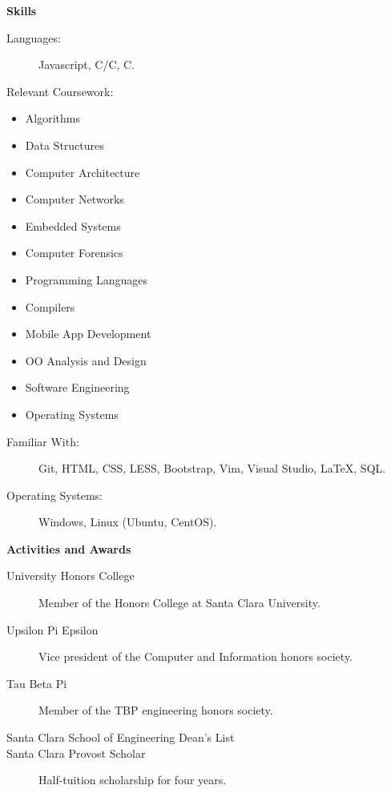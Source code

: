 \documentclass[letterpaper,11pt]{article}
\newcommand{\resheading}[1]{{\large \colorbox{mygrey}{\begin{minipage}{\textwidth}{\textbf{#1 \vphantom{p\^{E}}}}\end{minipage}}}}
\newcommand{\CC}{C\nolinebreak\hspace{-.05em}\raisebox{.4ex}{\tiny\bf +}\nolinebreak\hspace{-.10em}\raisebox{.4ex}{\tiny\bf +}}
\newcommand{\CS}{C\nolinebreak\hspace{-.05em}\raisebox{.4ex}{\scriptsize\bf \#}}
\begin{document}
\resheading{Skills}

\begin{description}
\item[Languages:]
Javascript, C/\CC, \CS.
\item[Relevant Coursework:]
\end{description}

\vspace*{-\baselineskip}
\begin{multicols}{3}
\begin{itemize}
\itemsep-2pt
\item Algorithms
\item Data Structures
\item Computer Architecture
\item Computer Networks
\item Embedded Systems
\item Computer Forensics
\item Programming Languages
\item Compilers
\item Mobile App Development
\item OO Analysis and Design
\item Software Engineering
\item Operating Systems
\end{itemize}
\end{multicols}


\begin{description}
\item[Familiar With:]
Git, HTML, CSS, LESS, Bootstrap, Vim, Visual Studio, \LaTeX, SQL.
\item[Operating Systems:]
Windows, Linux (Ubuntu, CentOS).
\end{description}

\resheading{Activities and Awards}

\begin{description}
\item[University Honors College]
Member of the Honors College at Santa Clara University.
\item[Upsilon Pi Epsilon]
Vice president of the Computer and Information honors society.
\item[Tau Beta Pi]
Member of the TBP engineering honors society.
\item[Santa Clara School of Engineering Dean's List]
\item[Santa Clara Provost Scholar]
Half-tuition scholarship for four years.
\end{description}



\end{document}
